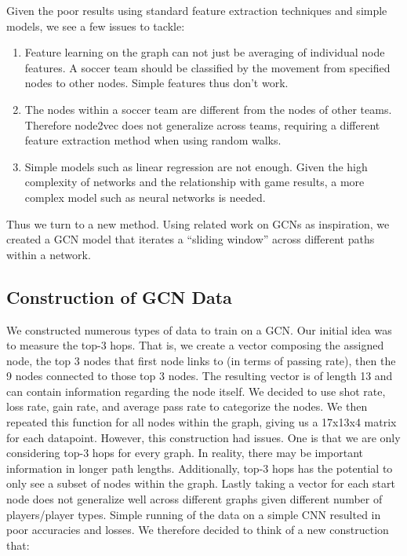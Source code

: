 Given the poor results using standard feature extraction techniques and simple models, we see a few issues to tackle:

\begin{enumerate}

    \item Feature learning on the graph can not just be averaging of individual node features. A soccer team should be classified by the movement from specified nodes to other nodes. Simple features thus don't work. 


    \item The nodes within a soccer team are different from the nodes of other teams. Therefore node2vec does not generalize across teams, requiring a different feature extraction method when using random walks. 


    \item Simple models such as linear regression are not enough. Given the high complexity of networks and the relationship with game results, a more complex model such as neural networks is needed. 

\end{enumerate}

Thus we turn to a new method. Using related work on GCNs as inspiration, we created a GCN model that iterates a ``sliding window'' across different paths within a network. 

\subsection{Construction of GCN Data}

We constructed numerous types of data to train on a GCN. Our initial idea was to measure the top-3 hops. That is, we create a vector composing the assigned node, the top 3 nodes that first node links to (in terms of passing rate), then the 9 nodes connected to those top 3 nodes. The resulting vector is of length 13 and can contain information regarding the node itself. We decided to use shot rate, loss rate, gain rate, and average pass rate to categorize the nodes. We then repeated this function for all nodes within the graph, giving us a 17x13x4 matrix for each datapoint. However, this construction had issues. One is that we are only considering top-3 hops for every graph. In reality, there may be important information in longer path lengths. Additionally, top-3 hops has the potential to only see a subset of nodes within the graph. Lastly taking a vector for each start node does not generalize well across different graphs given different number of players/player types. Simple running of the data on a simple CNN resulted in poor accuracies and losses. We therefore decided to think of a new construction that: 

